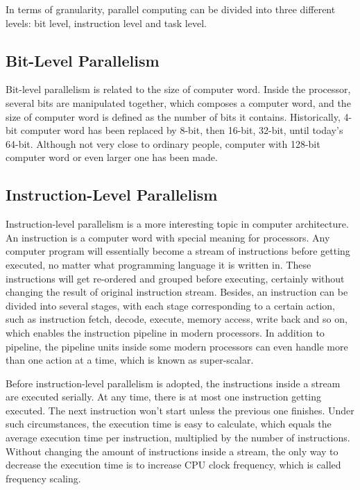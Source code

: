 \documentclass[12pt,a4]{report}
\begin{document}
In terms of granularity, parallel computing can be divided into three different levels: bit level, instruction level and task level.

\subsection{Bit-Level Parallelism}

Bit-level parallelism is related to the size of computer word. Inside the processor, several bits are manipulated together, which composes a computer word, and the size of computer word is defined as the number of bits it contains. Historically, 4-bit computer word has been replaced by 8-bit, then 16-bit, 32-bit, until today's 64-bit. Although not very close to ordinary people, computer with 128-bit computer word or even larger one has been made.

\subsection{Instruction-Level Parallelism}

Instruction-level parallelism is a more interesting topic in computer architecture. An instruction is a computer word with special meaning for processors. Any computer program will essentially become a stream of instructions before getting executed, no matter what programming language it is written in. These instructions will get re-ordered and grouped before executing, certainly without changing the result of original instruction stream. Besides, an instruction can be divided into several stages, with each stage corresponding to a certain action, such as instruction fetch, decode, execute, memory access, write back and so on, which enables the instruction pipeline in modern processors. In addition to pipeline, the pipeline units inside some modern processors can even handle more than one action at a time, which is known as super-scalar.

Before instruction-level parallelism is adopted, the instructions inside a stream are executed serially. At any time, there is at most one instruction getting executed. The next instruction won't start unless the previous one finishes. Under such circumstances, the execution time is easy to calculate, which equals the average execution time per instruction, multiplied by the number of instructions. Without changing the amount of instructions inside a stream, the only way to decrease the execution time is to increase CPU clock frequency, which is called frequency scaling.
\end{document}
